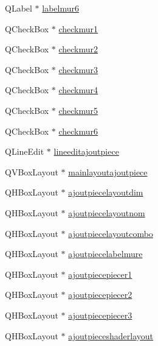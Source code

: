 \begin{DoxyCompactItemize}
\item 
Q\+Label $\ast$ \hyperlink{class_main_window_acabc7a22eeffa30597c1278617544a31}{labelmur6}
\item 
Q\+Check\+Box $\ast$ \hyperlink{class_main_window_aabce537f4ce40332b2411e31218abf37}{checkmur1}
\item 
Q\+Check\+Box $\ast$ \hyperlink{class_main_window_a9311b2ff986d09836c8e385348acd571}{checkmur2}
\item 
Q\+Check\+Box $\ast$ \hyperlink{class_main_window_a71169e71f8f50fc126c8cdaad981cad7}{checkmur3}
\item 
Q\+Check\+Box $\ast$ \hyperlink{class_main_window_a2e8fae74cfc9045da4dfcba506aacca4}{checkmur4}
\item 
Q\+Check\+Box $\ast$ \hyperlink{class_main_window_a13b9eb7874b1b8363eb8ee0399e0a6db}{checkmur5}
\item 
Q\+Check\+Box $\ast$ \hyperlink{class_main_window_a0e9dad3f68b376acacd166f6a58ea4dd}{checkmur6}
\item 
Q\+Line\+Edit $\ast$ \hyperlink{class_main_window_ac6b2333b54d4551f41d0941c7f171097}{lineeditajoutpiece}
\item 
Q\+V\+Box\+Layout $\ast$ \hyperlink{class_main_window_a9c7efc08e16b1648f53664b98dc99c00}{mainlayoutajoutpiece}
\item 
Q\+H\+Box\+Layout $\ast$ \hyperlink{class_main_window_ae06a728d54678994456d0585d265baf0}{ajoutpiecelayoutdim}
\item 
Q\+H\+Box\+Layout $\ast$ \hyperlink{class_main_window_a48cf0bbc5e90a751711519a7c7c2af7b}{ajoutpiecelayoutnom}
\item 
Q\+H\+Box\+Layout $\ast$ \hyperlink{class_main_window_a195ed8cd075a1153faa7926f38b08609}{ajoutpiecelayoutcombo}
\item 
Q\+H\+Box\+Layout $\ast$ \hyperlink{class_main_window_a7fc456fae07aba46102c8670721688e6}{ajoutpiecelabelmure}
\item 
Q\+H\+Box\+Layout $\ast$ \hyperlink{class_main_window_a49e6b8184f85caeec9b9936999387e8f}{ajoutpiecepiecer1}
\item 
Q\+H\+Box\+Layout $\ast$ \hyperlink{class_main_window_a01a7211a86eb47e523b13d18beedd7c5}{ajoutpiecepiecer2}
\item 
Q\+H\+Box\+Layout $\ast$ \hyperlink{class_main_window_ac059f285df8d02b2deaf915f82c4c247}{ajoutpiecepiecer3}
\item 
Q\+H\+Box\+Layout $\ast$ \hyperlink{class_main_window_aace055ea8d65d6138d60d7a40da1c707}{ajoutpieceshaderlayout}
\item 

\end{DoxyCompactItemize}
